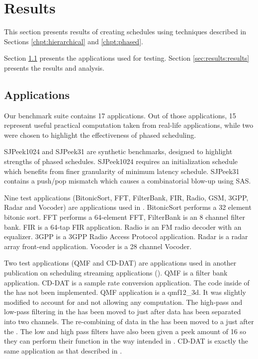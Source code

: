 \section{Results}
\label{chpt:results}

This section presents results of creating schedules using
techniques described in Sections \ref{chpt:hierarchical} and
\ref{chpt:phased}.

Section \ref{sec:results:apps} presents the applications used for
testing.  Section \ref{sec:results:results} presents the results and
analysis.

\subsection{Applications}
\label{sec:results:apps}

Our benchmark suite contains 17 applications. Out of those
applications, 15 represent useful practical computation taken from
real-life applications, while two were chosen to highlight the
effectiveness of phased scheduling.

SJPeek1024 and SJPeek31 are synthetic benchmarks, designed to
highlight strengths of phased schedules. SJPeek1024 requires an
initialization schedule which benefits from finer granularity of
minimum latency schedule. SJPeek31 contains a push/pop mismatch
which causes a combinatorial blow-up using SAS.

Nine test applications (BitonicSort, FFT, FilterBank, FIR, Radio,
GSM, 3GPP, Radar and Vocoder) are applications used in
\cite{Gordo02}. BitonicSort performs a 32 element bitonic sort.
FFT performs a 64-element FFT, FilterBank is an 8 channel filter
bank.  FIR is a 64-tap FIR application. Radio is an FM radio
decoder with an equalizer.  3GPP is a 3GPP Radio Access Protocol
application. Radar is a radar array front-end application. Vocoder
is a 28 channel Vocoder.

Two test applications (QMF and CD-DAT) are applications used in
another publication on scheduling streaming applications
(\cite{murthy99buffer}). QMF is a filter bank application. CD-DAT
is a sample rate conversion application. The code inside of the
{\filters} has not been implemented. QMF application is a
qmf12\_3d.  It was slightly modified to account for {\StreamIt}
{\splitters} and {\joiners} not allowing any computation. The
high-pass and low-pass filtering in the {\splitters} has been
moved to just after data has been separated into two channels. The
re-combining of data in the {\joiners} has been moved to a
{\filter} just after the {\joiners}. The low and high pass filters
have also been given a peek amount of 16 so they can perform their
function in the way intended in {\StreamIt}.
 CD-DAT is exactly the same application as
that described in \cite{murthy99buffer}.

